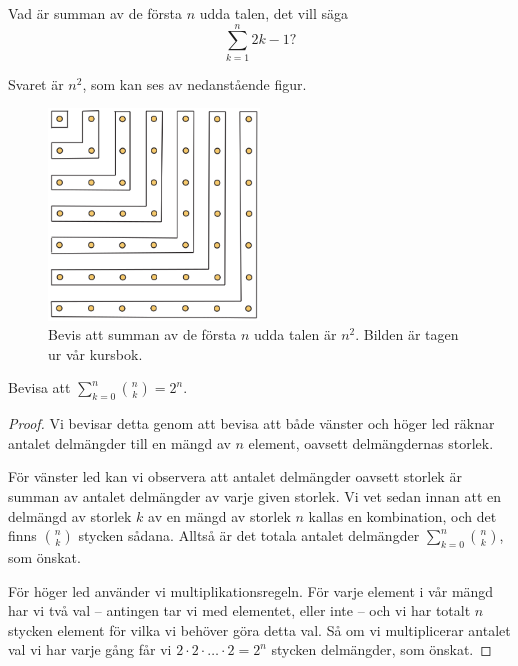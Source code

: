 \documentclass{tufte-handout}
\begin{document}
\begin{example}
  Vad är summan av de första $n$ udda talen, det vill säga
  $$\sum_{k=1}^n 2k - 1?$$

  Svaret är $n^2$, som kan ses av nedanstående figur.
  \begin{figure}[h]
    \centering
    \includegraphics[width=0.5\textwidth]{graphics/sum_of_odd_integers.png}
    \caption{Bevis att summan av de första $n$ udda talen är $n^2$. Bilden är tagen ur vår kursbok.}
  \end{figure}
\end{example}

\begin{example}\label{example_counting_all_subsets}
  Bevisa att $\sum_{k=0}^n \binom{n}{k} = 2^n$.

  \begin{proof}
    Vi bevisar detta genom att bevisa att både vänster och höger led räknar antalet delmängder till en mängd av $n$ element, oavsett delmängdernas storlek.

    För vänster led kan vi observera att antalet delmängder oavsett storlek är summan av antalet delmängder av varje given storlek. Vi vet sedan innan att en delmängd av storlek $k$ av en mängd av storlek $n$ kallas en kombination, och det finns $\binom{n}{k}$ stycken sådana. Alltså är det totala antalet delmängder $\sum_{k=0}^n \binom{n}{k}$, som önskat.

    För höger led använder vi multiplikationsregeln. För varje element i vår mängd har vi två val -- antingen tar vi med elementet, eller inte -- och vi har totalt $n$ stycken element för vilka vi behöver göra detta val. Så om vi multiplicerar antalet val vi har varje gång får vi $2\cdot2\cdot\ldots\cdot2 = 2^n$ stycken delmängder, som önskat.
  \end{proof}
\end{example}
\end{document}
